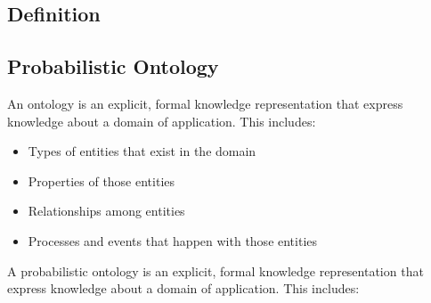 \subsection{Definition}

\subsection{Probabilistic Ontology}

\begin{frame}
	An ontology is an explicit, formal knowledge representation that express knowledge about a domain of application. This includes:
	\begin{itemize}
		\item Types of entities that exist in the domain
		\item Properties of those entities
		\item Relationships among entities
		\item Processes and events that happen with those entities
	\end{itemize}
\end{frame}

\begin{frame}
	A \alert{probabilistic} ontology is an explicit, formal knowledge representation that express knowledge about a domain of application. This includes:
\end{frame}


